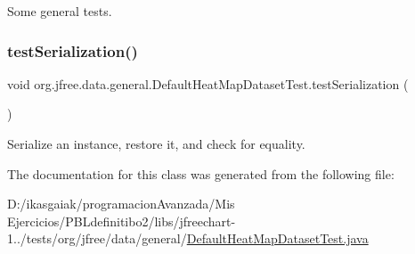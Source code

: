 Some general tests. \mbox{\label{classorg_1_1jfree_1_1data_1_1general_1_1_default_heat_map_dataset_test_a3722936049e4b821de6dc4972e7f562a}} 
\subsubsection{\texorpdfstring{test\+Serialization()}{testSerialization()}}
{\footnotesize\ttfamily void org.\+jfree.\+data.\+general.\+Default\+Heat\+Map\+Dataset\+Test.\+test\+Serialization (\begin{DoxyParamCaption}{ }\end{DoxyParamCaption})}

Serialize an instance, restore it, and check for equality. 

The documentation for this class was generated from the following file\+:\begin{DoxyCompactItemize}
\item 
D\+:/ikasgaiak/programacion\+Avanzada/\+Mis Ejercicios/\+P\+B\+Ldefinitibo2/libs/jfreechart-\/1../tests/org/jfree/data/general/\mbox{\hyperlink{_default_heat_map_dataset_test_8java}{Default\+Heat\+Map\+Dataset\+Test.\+java}}\end{DoxyCompactItemize}
